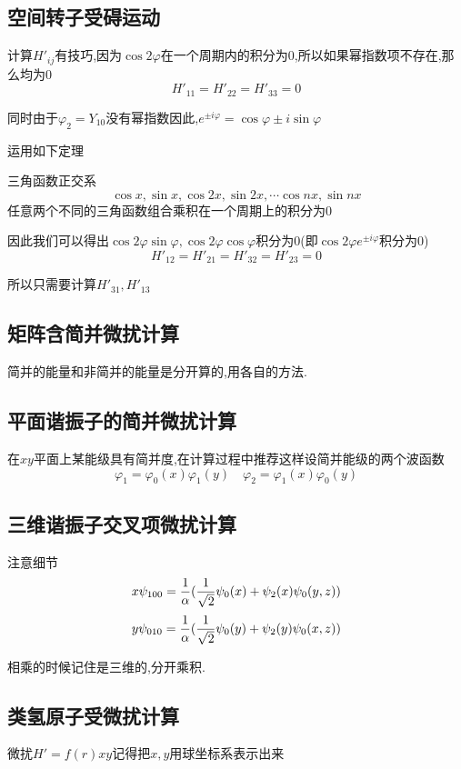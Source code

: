 \documentclass{article}
\begin{document}
        \subsection{空间转子受碍运动}
            计算$H'_{ij}$有技巧,因为$\cos{2\varphi}$在一个周期内的积分为0,所以如果幂指数项不存在,那么均为0
            $$ H'_{11} = H'_{22} = H'_{33} = 0 $$

            同时由于$\varphi_{2} = Y_{10}$没有幂指数因此,$e^{\pm i \varphi} = \cos{\varphi}  \pm i \sin{\varphi}$

            运用如下定理
            \begin{formal}
                三角函数正交系
                $$ \cos{x},\sin{x},\cos{2x},\sin{2x},\cdots\cos{nx},\sin{nx}$$
                任意两个不同的三角函数组合乘积在一个周期上的积分为0
            \end{formal}
            因此我们可以得出$ \cos{2\varphi}\sin{\varphi},\cos{2\varphi}\cos{\varphi}$积分为0(即$\cos{2\varphi} e^{\pm i\varphi}$积分为0)
            $$ H'_{12} = H'_{21} = H'_{32} = H'_{23} = 0 $$
            
            所以只需要计算$H'_{31} , H'_{13}$

        \subsection{矩阵含简并微扰计算}
            简并的能量和非简并的能量是分开算的,用各自的方法.

        \subsection{平面谐振子的简并微扰计算}
            在$xy$平面上某能级具有简并度,在计算过程中推荐这样设简并能级的两个波函数
            $$ \varphi_{1} = \varphi_{0}(x)\varphi_{1}(y) \quad \varphi_{2} = \varphi_{1}(x) \varphi_{0}(y) $$


        \subsection{三维谐振子交叉项微扰计算}
            注意细节
            $$ x\psi_{100} = \frac{1}{\alpha} (\frac{1}{\sqrt{2}} \psi_{0} (x) + \psi_{2} (x) \psi_{0} (y,z)) $$
            $$ y\psi_{010} = \frac{1}{\alpha} (\frac{1}{\sqrt{2}} \psi_{0} (y) + \psi_{2} (y) \psi_{0} (x,z)) $$

            相乘的时候记住是三维的,分开乘积.


        \subsection{类氢原子受微扰计算}
            微扰$ H' = f(r)xy $记得把$x,y$用球坐标系表示出来
\end{document}

